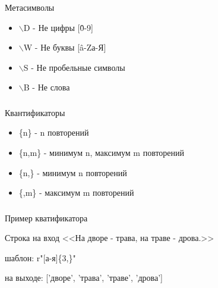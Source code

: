 \documentclass[t, 11pt]{beamer}
\begin{document}
	\begin{frame}
	\frametitle{\insertsection}
	\frametitle{\insertsubsection}  
	Метасимволы
	\begin{itemize}
		\item $\backslash$D - Не цифры [\^0-9]
		\item $\backslash$W - Не буквы [\^a-Zа-Я]
		\item $\backslash$S - Не пробельные символы 
		\item  $\backslash$B - Не слова
	\end{itemize}
\end{frame}
	\begin{frame}
	\frametitle{\insertsection}
	\frametitle{\insertsubsection}  
	Квантификаторы 
	\begin{itemize}
		\item \{n\} - n повторений
		\item \{n,m\} - минимум n, максимум m повторений
		\item \{n,\} - минимум n повторений
		\item \{,m\} - максимум m повторений
	\end{itemize}
\end{frame}

	\begin{frame}
	\frametitle{\insertsection}
	\frametitle{\insertsubsection}  
	Пример кватификатора
	
	\vspace{0.5cm}
	
	Строка на вход  <<На дворе - трава, на траве - дрова.>>
	
	\vspace{0.5cm}
	
	шаблон: r"[а-я]\{3,\}"
	
	\vspace{0.5cm}
	
	на выходе: ['дворе', 'трава', 'траве', 'дрова']
	
\end{frame}
\end{document}
